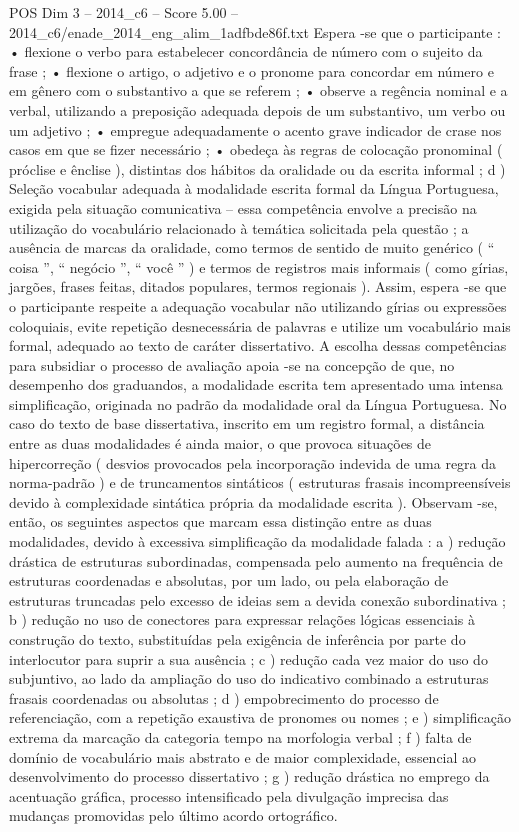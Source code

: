 \begin{textsample}{POS Dim 3 – 2014\_c6 – Score 5.00 – 2014\_c6/enade\_2014\_eng\_alim\_1adfbde86f.txt}
Espera -se que o participante : • flexione o verbo para estabelecer concordância de número com o sujeito da frase ; • flexione o artigo, o adjetivo e o pronome para concordar em número e em gênero com o substantivo a que se referem ; • observe a regência nominal e a verbal, utilizando a preposição adequada depois de um substantivo, um verbo ou um adjetivo ; • empregue adequadamente o acento grave indicador de crase nos casos em que se fizer necessário ; • obedeça às regras de colocação pronominal ( próclise e ênclise ), distintas dos hábitos da oralidade ou da escrita informal ; d ) Seleção vocabular adequada à modalidade escrita formal da Língua Portuguesa, exigida pela situação comunicativa – essa competência envolve a precisão na utilização do vocabulário relacionado à temática solicitada pela questão ; a ausência de marcas da oralidade, como termos de sentido de muito genérico ( “ coisa ”, “ negócio ”, “ você ” ) e termos de registros mais informais ( como gírias, jargões, frases feitas, ditados populares, termos regionais ).
Assim, espera -se que o participante respeite a adequação vocabular não utilizando gírias ou expressões coloquiais, evite repetição desnecessária de palavras e utilize um vocabulário mais formal, adequado ao texto de caráter dissertativo.
A escolha dessas competências para subsidiar o processo de avaliação apoia -se na concepção de que, no desempenho dos graduandos, a modalidade escrita tem apresentado uma intensa simplificação, originada no padrão da modalidade oral da Língua Portuguesa.
No caso do texto de base dissertativa, inscrito em um registro formal, a distância entre as duas modalidades é ainda maior, o que provoca situações de hipercorreção ( desvios provocados pela incorporação indevida de uma regra da norma-padrão ) e de truncamentos sintáticos ( estruturas frasais incompreensíveis devido à complexidade sintática própria da modalidade escrita ).
Observam -se, então, os seguintes aspectos que marcam essa distinção entre as duas modalidades, devido à excessiva simplificação da modalidade falada : a ) redução drástica de estruturas subordinadas, compensada pelo aumento na frequência de estruturas coordenadas e absolutas, por um lado, ou pela elaboração de estruturas truncadas pelo excesso de ideias sem a devida conexão subordinativa ; b ) redução no uso de conectores para expressar relações lógicas essenciais à construção do texto, substituídas pela exigência de inferência por parte do interlocutor para suprir a sua ausência ; c ) redução cada vez maior do uso do subjuntivo, ao lado da ampliação do uso do indicativo combinado a estruturas frasais coordenadas ou absolutas ; d ) empobrecimento do processo de referenciação, com a repetição exaustiva de pronomes ou nomes ; e ) simplificação extrema da marcação da categoria tempo na morfologia verbal ; f ) falta de domínio de vocabulário mais abstrato e de maior complexidade, essencial ao desenvolvimento do processo dissertativo ; g ) redução drástica no emprego da acentuação gráfica, processo intensificado pela divulgação imprecisa das mudanças promovidas pelo último acordo ortográfico.

\end{textsample}
